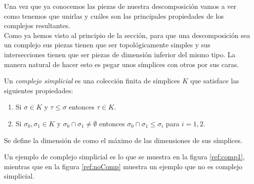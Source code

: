 Una vez que ya conocemos las piezas de nuestra descomposición vamos a ver como tenemos que unirlas y cuáles son las principales propiedades de los complejos resultantes.\\
Como ya hemos visto al principio de la sección, para que una descomposición sea un complejo sus piezas tienen que ser topológicamente simples y sus intersecciones tienen que ser piezas de dimensión inferior del mismo tipo. La manera natural de hacer esto es pegar unos símplices con otros por sus caras.

\begin{definition}
Un \emph{complejo simplicial} es una colección finita de símplices $K$ que satisface las siguientes propiedades:
\begin{enumerate}
	\item Si $\sigma \in K$ y $\tau \leq \sigma$ entonces $\tau \in K$.
	\item Si $\sigma_0,\sigma_1 \in K$ y $\sigma_0 \cap \sigma_1 \neq \emptyset$ entonces $\sigma_0 \cap \sigma_1 \leq \sigma_i$ para $i = 1,2$.
\end{enumerate}
\end{definition}

Se define la dimensión de como el máximo de las dimensiones de sus símplices.

Un ejemplo de complejo simplicial es lo que se muestra en la figura \ref{ref:comp1}, mientras que en la figura \ref{ref:noComp} muestra un ejemplo que no es complejo simplicial.


